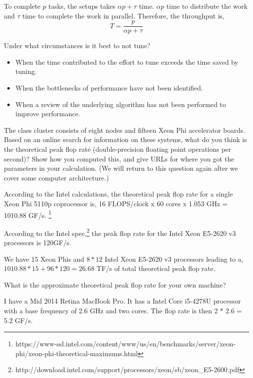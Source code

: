 \documentclass{5220hw}
\begin{document}
\begin{exercises}
To complete $p$ tasks, the setups takes $\alpha p + \tau$ time. $\alpha p$ time to distribute the work and $\tau$ time to complete the work in parallel. Therefore, the throughput is, 
\begin{equation}
	T = \dfrac{p}{ \alpha p + \tau }
\end{equation}

\item Under what circumstances is it best to not tune?

\begin{itemize}
	\item When the time contributed to the effort to tune exceeds the time saved by tuning.
	\item When the bottlenecks of performance have not been identified.
	\item When a review of the underlying algorithm has not been performed to improve performance.
\end{itemize}

\item The class cluster consists of eight nodes and fifteen Xeon Phi accelerator boards.  Based on an online search for information on these systems, what do you think is the theoretical peak flop rate (double-precision floating point operations per second)?  Show how you computed this, and give URLs for where you got the parameters in your calculation.  (We will return to this question again after we cover some computer architecture.)

According to the Intel calculations, the theoretical peak flop rate for a single Xeon Phi 5110p coprocessor is,
16 FLOPS/clock x 60 cores x 1.053 GHz = 1010.88 GF/s.
\footnote{https://www-ssl.intel.com/content/www/us/en/benchmarks/server/xeon-phi/xeon-phi-theoretical-maximums.html}

According to the Intel spec,\footnote{http://download.intel.com/support/processors/xeon/sb/xeon\_E5-2600.pdf} the peak flop rate for the Intel Xeon E5-2620 v3 processors is 120GF/s. 

We have 15 Xeon Phis and $8 * 12$ Intel Xeon E5-2620 v3 processors leading to a, \\
$1010.88 * 15 + 96 * 120 = 26.68$ TF/s of total theoretical peak flop rate.

\item What is the approximate theoretical peak flop rate for your own machine?

I have a Mid 2014 Retina MacBook Pro. It has a Intel Core i5-4278U processor with a base frequency of 2.6 GHz and two cores. The flop rate is then 2 * 2.6 = 5.2 GF/s.

\end{exercises}
\end{document}
